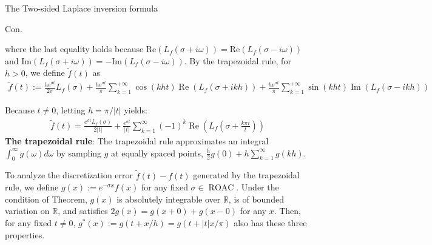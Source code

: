 \documentclass{beamer}
\begin{document}
\begin{frame}{The Two-sided Laplace inversion formula}


    {\footnotesize \scriptsize
    \par Con.
    \par where the last equality holds because \( \text{Re}(L_f(\sigma + i\omega)) 
    = \text{Re}(L_f(\sigma - i\omega)) \) and \( \text{Im}(L_f(\sigma + i\omega)) = -\text{Im}(L_f(\sigma - i\omega)) \). 
    By the trapezoidal rule, for \( h > 0 \), we define \(\tilde{f}(t)\) as
    \begin{align*}
        \tilde{f}(t) := \frac{he^{\sigma t}}{2\pi} L_f(\sigma) + \frac{he^{\sigma t}}{\pi} \sum_{k=1}^{+\infty} 
        \cos(kht) \operatorname{Re}(L_f(\sigma + ikh)) 
        + \frac{he^{\sigma t}}{\pi} \sum_{k=1}^{+\infty} \sin(kht) \operatorname{Im}(L_f(\sigma - ikh))
    \end{align*}
    \par  \pause Because \( t \neq 0 \), letting \( h = \pi / |t| \) yields:
    \begin{align*}
        \tilde{f}(t) = \frac{e^{\sigma t} L_f(\sigma)}{2|t|} + 
        \frac{e^{\sigma t}}{|t|} \sum_{k=1}^{\infty} (-1)^k \operatorname{Re} \left( L_f \left( \sigma + \frac{k\pi i}{t} \right) \right)
    \end{align*}
    \textbf{The trapezoidal rule}: The trapezoidal rule approximates an integral $\int_{0}^{\infty} g(\omega)  d\omega$ 
    by sampling \( g \) at equally spaced points, $\frac{h}{2} g(0) + h \sum_{k=1}^{\infty} g(kh).$  
    \par \pause  To analyze the discretization error \(\tilde{f}(t) - f(t)\) generated by
     the trapezoidal rule, we define \( g(x) := e^{-\sigma x} f(x) \) for any fixed \(\sigma \in \operatorname{ROAC}\). 
     Under the condition of Theorem, \( g(x) \) is absolutely integrable over \(\mathbb{R}\), is of bounded variation on \(\mathbb{R}\), 
     and satisfies \( 2g(x) = g(x+0) + g(x-0) \) for any \( x \).
      Then, for any fixed \( t \neq 0 \), \( g^*(x) := g(t + x/h) = g(t + |t| x/\pi) \) also has these three properties. 
    }
    
\end{frame}
\end{document}
